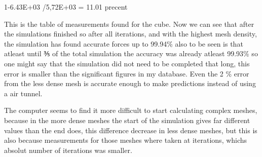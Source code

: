 \documentclass[12pt,a4paper]{article}
\begin{document}
\begin{table}[H]
\centering
\caption{Full data collected for the cube simulation}
\label{tab:cube_results}
\end{table}

1-6.43E+03 /5,72E+03 = 11.01 precent

This is the table of measurements found for the cube. Now we can see that  after the simulations finished so after all iterations, and with the highest mesh density, the simulation has found accurate forces up to 99.94\% also to be seen is that atleast until ⅗ of the total simulation the accuracy was already atleast 99.93\% so one might say that the simulation did not need to be completed that long, this error is smaller than the significant figures in my database. Even the 2 \% error from the less dense mesh is accurate enough to make predictions instead of using a air tunnel. 

The computer seems to find it more difficult to start calculating complex meshes, because in the more dense meshes the start of the simulation gives far different values than the end does, this difference decrease in less dense meshes, but this is also because measurements for those meshes where taken at iterations, whichs absolut number of iterations was smaller.
\end{document}
